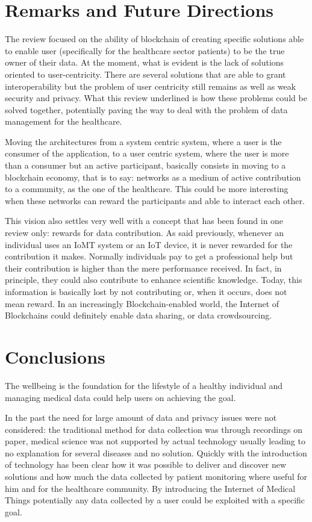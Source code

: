 \documentclass[preprint]{elsarticle}
\begin{document}
\section{Remarks and Future Directions}
The review focused on the ability of blockchain of creating specific solutions able to enable user (specifically for the healthcare sector patients) to be the true owner of their data. At the moment, what is evident is the lack of solutions oriented to user-centricity. There are several solutions that are able to grant interoperability but the problem of user centricity still remains as well as weak security and privacy. What this review underlined is how these problems could be solved together, potentially paving the way to deal with the problem of data management for the healthcare.
 
Moving the architectures from a system centric system, where a user is the consumer of the application, to a user centric system, where the user is more than a consumer but an active participant, basically consists in moving to a blockchain economy, that is to say: networks as a medium of active contribution to a community, as the one of the healthcare. This could be more interesting when these networks can reward the participants and able to interact each other.

This vision also settles very well with a concept that has been found in one review only: rewards for data contribution. As said previously, whenever an individual uses an IoMT system or an IoT device, it is never rewarded for the contribution it makes. Normally individuals pay to get a professional help but their contribution is higher than the mere performance received. In fact, in principle, they could also contribute to enhance scientific knowledge. Today, this information is basically lost by not contributing or, when it occurs, does not mean reward. In an increasingly Blockchain-enabled world, the Internet of Blockchains could definitely enable data sharing, or data crowdsourcing.

\section{Conclusions}
The wellbeing is the foundation for the lifestyle of a healthy individual and managing medical data could help users on achieving the goal. 

In the past the need for large amount of data and privacy issues were not considered: the traditional method for data collection was through recordings on paper, medical science was not supported by actual technology usually leading to no explanation for several diseases and no solution. Quickly with the introduction of technology has been clear how it was possible to deliver and discover new solutions and how much the data collected by patient monitoring where useful for him and for the healthcare community. By introducing the Internet of Medical Things potentially any data collected by a user could be exploited with a specific goal. 
\end{document}

